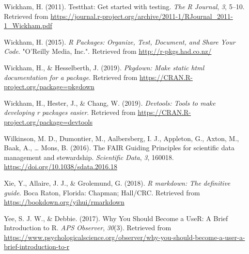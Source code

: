 \documentclass[
  english,
  jou,floatsintext]{apa6}
\newlength{\cslhangindent}
\newenvironment{cslreferences}%
  {\setlength{\parindent}{0pt}%
  \everypar{\setlength{\hangindent}{\cslhangindent}}\ignorespaces}%
  {\par}
\begin{document}
\begin{cslreferences}
\leavevmode\hypertarget{ref-R-testthat}{}%
Wickham, H. (2011). Testthat: Get started with testing. \emph{The R Journal}, \emph{3}, 5--10. Retrieved from \url{https://journal.r-project.org/archive/2011-1/RJournal_2011-1_Wickham.pdf}

\leavevmode\hypertarget{ref-WickhamPackagesOrganizeTest2015}{}%
Wickham, H. (2015). \emph{R Packages: Organize, Test, Document, and Share Your Code}. "O'Reilly Media, Inc.". Retrieved from \url{http://r-pkgs.had.co.nz/}

\leavevmode\hypertarget{ref-R-pkgdown}{}%
Wickham, H., \& Hesselberth, J. (2019). \emph{Pkgdown: Make static html documentation for a package}. Retrieved from \url{https://CRAN.R-project.org/package=pkgdown}

\leavevmode\hypertarget{ref-R-devtools}{}%
Wickham, H., Hester, J., \& Chang, W. (2019). \emph{Devtools: Tools to make developing r packages easier}. Retrieved from \url{https://CRAN.R-project.org/package=devtools}

\leavevmode\hypertarget{ref-WilkinsonFAIRGuidingPrinciples2016}{}%
Wilkinson, M. D., Dumontier, M., Aalbersberg, I. J., Appleton, G., Axton, M., Baak, A., \ldots{} Mons, B. (2016). The FAIR Guiding Principles for scientific data management and stewardship. \emph{Scientific Data}, \emph{3}, 160018. \url{https://doi.org/10.1038/sdata.2016.18}

\leavevmode\hypertarget{ref-R-rmarkdown}{}%
Xie, Y., Allaire, J. J., \& Grolemund, G. (2018). \emph{R markdown: The definitive guide}. Boca Raton, Florida: Chapman; Hall/CRC. Retrieved from \url{https://bookdown.org/yihui/rmarkdown}

\leavevmode\hypertarget{ref-yee_why_2017}{}%
Yee, S. J. W., \& Debbie. (2017). Why You Should Become a UseR: A Brief Introduction to R. \emph{APS Observer}, \emph{30}(3). Retrieved from \url{https://www.psychologicalscience.org/observer/why-you-should-become-a-user-a-brief-introduction-to-r}
\end{cslreferences}

\endgroup
\end{document}
